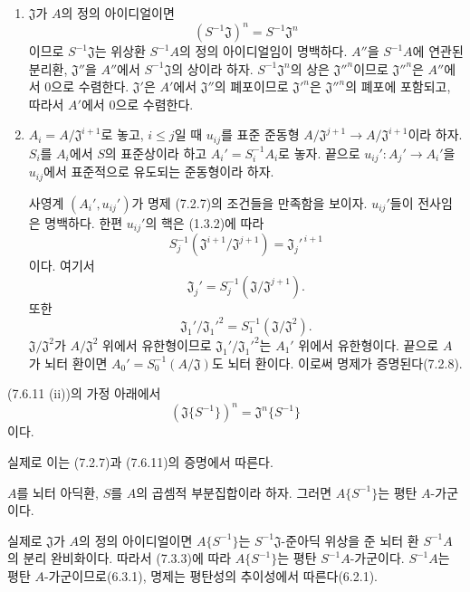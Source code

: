 \begin{enumerate}
  \item[(i)] $\mathfrak J$가 $A$의 정의 아이디얼이면
    \[
      (S^{-1}\mathfrak J)^n=S^{-1}\mathfrak J^n
    \]
    이므로 $S^{-1}\mathfrak J$는 위상환 $S^{-1}A$의 정의
    아이디얼임이 명백하다. $A''$을 $S^{-1}A$에 연관된 분리환,
    $\mathfrak J''$을 $A''$에서 $S^{-1}\mathfrak J$의 상이라 하자.
    $S^{-1}\mathfrak J^n$의 상은 $\mathfrak J''^n$이므로
    $\mathfrak J''^n$은 $A''$에서 $0$으로 수렴한다.
    $\mathfrak J'$은 $A'$에서 $\mathfrak J''$의 폐포이므로
    $\mathfrak J'^n$은 $\mathfrak J''^n$의 폐포에 포함되고, 따라서
    $A'$에서 $0$으로 수렴한다.

  \item[(ii)] $A_i=A/\mathfrak J^{i+1}$로 놓고, $i\leq j$일 때
    $u_{ij}$를 표준 준동형
    $A/\mathfrak J^{j+1}\to A/\mathfrak J^{i+1}$이라 하자. $S_i$를
    $A_i$에서 $S$의 표준상이라 하고 $A_i'=S_i^{-1}A_i$로 놓자.
    끝으로 $u_{ij}':A_j'\to A_i'$을 $u_{ij}$에서 표준적으로
    유도되는 준동형이라 하자.

    사영계 $(A_i',u_{ij}')$가 명제 (7.2.7)의 조건들을 만족함을
    보이자. $u_{ij}'$들이 전사임은 명백하다. 한편 $u_{ij}'$의 핵은
    (1.3.2)에 따라
    \[
      S_j^{-1}(\mathfrak J^{i+1}/\mathfrak J^{j+1})
      =\mathfrak J_j'^{\,i+1}
    \]
    이다. 여기서
    \[
      \mathfrak J_j'=S_j^{-1}(\mathfrak J/\mathfrak J^{j+1}).
    \]
    또한
    \[
      \mathfrak J_1'/\mathfrak J_1'^2
      =S_1^{-1}(\mathfrak J/\mathfrak J^2).
    \]
    $\mathfrak J/\mathfrak J^2$가 $A/\mathfrak J^2$ 위에서
    유한형이므로 $\mathfrak J_1'/\mathfrak J_1'^2$는 $A_1'$ 위에서
    유한형이다. 끝으로 $A$가 뇌터 환이면
    $A_0'=S_0^{-1}(A/\mathfrak J)$도 뇌터 환이다. 이로써 명제가
    증명된다(7.2.8).
\end{enumerate}

\begin{corollary}[7.6.12]
\label{0.7.6.12-ko}
(7.6.11 (ii))의 가정 아래에서
\[
  (\mathfrak J\{S^{-1}\})^n=\mathfrak J^n\{S^{-1}\}
\]
이다.
\end{corollary}

실제로 이는 (7.2.7)과 (7.6.11)의 증명에서 따른다.

\begin{proposition}[7.6.13]
\label{0.7.6.13-ko}
$A$를 뇌터 아딕환, $S$를 $A$의 곱셈적 부분집합이라 하자. 그러면
$A\{S^{-1}\}$는 평탄 $A$-가군이다.
\end{proposition}

실제로 $\mathfrak J$가 $A$의 정의 아이디얼이면
$A\{S^{-1}\}$는 $S^{-1}\mathfrak J$-준아딕 위상을 준 뇌터 환
$S^{-1}A$의 분리 완비화이다. 따라서 (7.3.3)에 따라
$A\{S^{-1}\}$는 평탄 $S^{-1}A$-가군이다. $S^{-1}A$는 평탄
$A$-가군이므로(6.3.1), 명제는 평탄성의 추이성에서 따른다(6.2.1).

